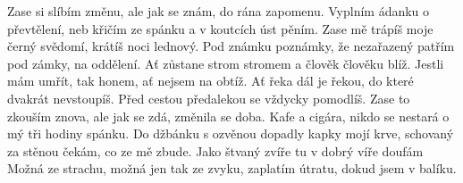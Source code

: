 \ve{}
Zase si slíbím změnu,
ale jak se znám,
do rána zapomenu.
Vyplním ádanku o převtělení,
neb křičím ze spánku
a v koutcích úst pěním.
\ve{}
Zase mě trápíš
moje černý svědomí,
krátíš noci lednový.
Pod známku poznámky,
že nezařazený
patřím pod zámky, na oddělení.
\cho{}
Ať zůstane strom stromem
a člověk člověku blíž.
Jestli mám umřít,
tak honem,
ať nejsem na obtíž.
Ať řeka dál je řekou,
do které dvakrát nevstoupíš.
Před cestou předalekou
se vždycky pomodlíš.
\ve{}
Zase to zkouším znova,
ale jak se zdá,
změnila se doba.
Kafe a cigára,
nikdo se nestará
o mý tři hodiny spánku.
\ve{}
Do džbánku s ozvěnou
dopadly kapky mojí krve,
schovaný za stěnou čekám,
co ze mě zbude.
Jako štvaný zvíře
tu v dobrý víře
doufám
\cho{}
Možná ze strachu,
možná jen tak ze zvyku,
zaplatím útratu,
dokud jsem v balíku.
\esong{}